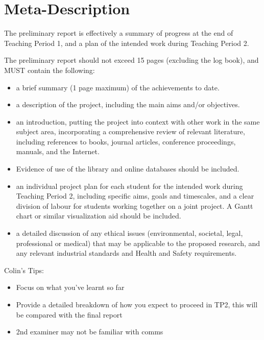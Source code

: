 \section{Meta-Description}

The preliminary report is effectively a summary of progress at the end
of Teaching Period 1, and a plan of the intended work during Teaching
Period 2.

The preliminary report should not exceed 15 pages (excluding the log
book), and MUST contain the following:

\begin{itemize}
\itemsep1pt\parskip0pt
\item
  a brief summary (1 page maximum) of the achievements to date.
\item
  a description of the project, including the main aims and/or
  objectives.
\item
  an introduction, putting the project into context with other work in
  the same subject area, incorporating a comprehensive review of
  relevant literature, including references to books, journal articles,
  conference proceedings, manuals, and the Internet.
\item
  Evidence of use of the library and online databases should be
  included.
\item
  an individual project plan for each student for the intended work
  during Teaching Period 2, including specific aims, goals and
  timescales, and a clear division of labour for students working
  together on a joint project. A Gantt chart or similar visualization
  aid should be included.
\item
  a detailed discussion of any ethical issues (environmental, societal,
  legal, professional or medical) that may be applicable to the proposed
  research, and any relevant industrial standards and Health and Safety
  requirements.
\end{itemize}

Colin's Tips:

\begin{itemize}
\itemsep1pt\parskip0pt
\item
  Focus on what you've learnt so far
\item
  Provide a detailed breakdown of how you expect to proceed in TP2, this
  will be compared with the final report
\item
  2nd examiner may not be familiar with comms
\end{itemize}

